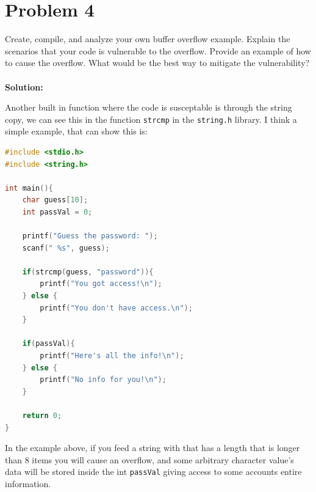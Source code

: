 \documentclass[12pt]{article}
\newcommand\tab[1][0.5cm]{\hspace*{#1}}
\begin{document}

\section{Problem 4}
\tab Create, compile, and analyze your own buffer overflow example. Explain the scenarios that your
code is vulnerable to the overflow. Provide an example of how to cause the overflow. What
would be the best way to mitigate the vulnerability?
\textbf{\\ \\Solution:}

Another built in function where the code is susceptable is through the string copy, we can see this in 
the function \texttt{strcmp} in the \texttt{string.h} library. I think a simple example, that can show this is:

\begin{lstlisting}[language=C]
#include <stdio.h>
#include <string.h>

int main(){
	char guess[10];
	int passVal = 0;
	
	printf("Guess the password: ");
	scanf(" %s", guess);
	
	if(strcmp(guess, "password")){
		printf("You got access!\n");
	} else {
		printf("You don't have access.\n");
	}
	
	if(passVal){
		printf("Here's all the info!\n");
	} else {
		printf("No info for you!\n");
	}
	
	return 0;
}
\end{lstlisting}

In the example above, if you feed a string with that has a length that is longer than 8 items you
will cause an overflow, and some arbitrary character value's data will be stored inside the int
\texttt{passVal} giving access to some accounts entire information. 


\end{document}
